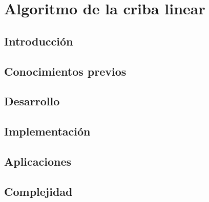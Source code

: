 \chapter{Algoritmo de la criba linear}
\section{Introducción}

\section{Conocimientos previos}

\section{Desarrollo}

\section{Implementación}

\section{Aplicaciones}

\section{Complejidad}

%